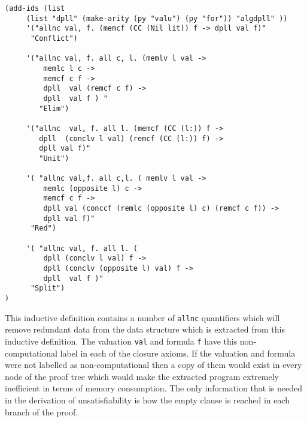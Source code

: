 \begin{lstlisting}[caption = "The DPLL Proof System as an Inductive Definition in Minlog"]
(add-ids (list 
     (list "dpll" (make-arity (py "valu") (py "for")) "algdpll" ))
     '("allnc val, f. (memcf (CC (Nil lit)) f -> dpll val f)"
      "Conflict")

     '("allnc val, f. all c, l. (memlv l val ->                                                                                                             
         memlc l c ->                                                                                                                     
         memcf c f ->                                                                                                                     
         dpll  val (remcf c f) ->                                                                                                         
         dpll  val f ) "
        "Elim")

     '("allnc  val, f. all l. (memcf (CC (l:)) f ->                                                                                                         
        dpll  (conclv l val) (remcf (CC (l:)) f) ->                                                                                        
        dpll val f)"
        "Unit")

     '( "allnc val,f. all c,l. ( memlv l val ->                                                                                                             
         memlc (opposite l) c ->                                                                                                         
         memcf c f ->                                                                                                                    
         dpll val (conccf (remlc (opposite l) c) (remcf c f)) ->                                                                         
         dpll val f)"
      "Red")

     '( "allnc val, f. all l. (                                                                                                                             
         dpll (conclv l val) f ->                                                                                                         
         dpll (conclv (opposite l) val) f ->                                                                                              
         dpll  val f )"
      "Split")
)
\end{lstlisting}

This inductive definition contains a number of \texttt{allnc} quantifiers which will remove redundant data from the data structure which is extracted from this inductive definition. The valuation \texttt{val} and formula \texttt{f} have this non-computational label in each of the closure axioms. If the valuation and formula were not labelled as non-computational then a copy of them would exist in every node of the proof tree which would make the extracted program extremely inefficient in terms of memory consumption. The only information that is needed in the derivation of unsatisfiability is how the empty clause is reached in each branch of the proof.


